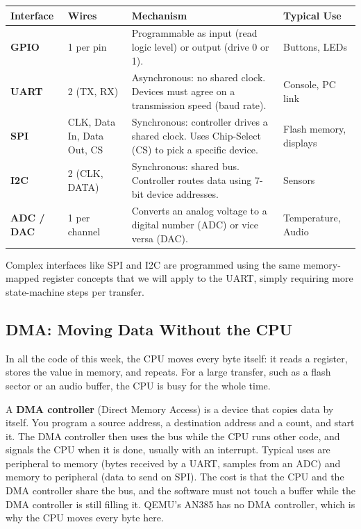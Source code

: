 \begin{table}[h!]
    \centering
    \begin{tabular}{lp{2.5cm}p{5.5cm}p{3cm}}
        \toprule
        \textbf{Interface} & \textbf{Wires} & \textbf{Mechanism} & \textbf{Typical Use} \\
        \midrule
        \textbf{GPIO} & 1 per pin & Programmable as input (read logic level) or output (drive 0 or 1). & Buttons, LEDs \\
        \textbf{UART} & 2 (TX, RX) & Asynchronous: no shared clock. Devices must agree on a transmission speed (baud rate). & Console, PC link \\
        \textbf{SPI} & CLK, Data In, Data Out, CS & Synchronous: controller drives a shared clock. Uses Chip-Select (CS) to pick a specific device. & Flash memory, displays \\
        \textbf{I2C} & 2 (CLK, DATA) & Synchronous: shared bus. Controller routes data using 7-bit device addresses. & Sensors \\
        \textbf{ADC / DAC} & 1 per channel & Converts an analog voltage to a digital number (ADC) or vice versa (DAC). & Temperature, Audio \\
        \bottomrule
    \end{tabular}
\end{table}

Complex interfaces like SPI and I2C are programmed using the same memory-mapped register concepts that we will apply to the UART, simply requiring more state-machine steps per transfer.

\subsection{DMA: Moving Data Without the CPU}
In all the code of this week, the CPU moves every byte itself: it reads a register, stores the value in memory, and repeats. For a large transfer, such as a flash sector or an audio buffer, the CPU is busy for the whole time.

A \textbf{DMA controller} (Direct Memory Access) is a device that copies data by itself. You program a source address, a destination address and a count, and start it. The DMA controller then uses the bus while the CPU runs other code, and signals the CPU when it is done, usually with an interrupt. Typical uses are peripheral to memory (bytes received by a UART, samples from an ADC) and memory to peripheral (data to send on SPI). The cost is that the CPU and the DMA controller share the bus, and the software must not touch a buffer while the DMA controller is still filling it. QEMU's AN385 has no DMA controller, which is why the CPU moves every byte here.

